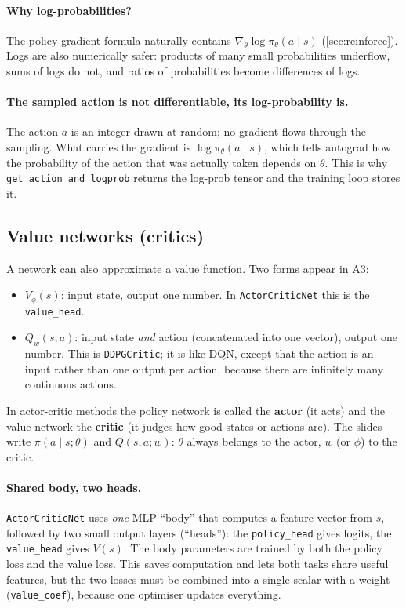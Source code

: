 \documentclass[11pt,a4paper]{article}
\newcommand{\pit}{\pi_\theta}
\newcommand{\gradt}{\nabla_\theta}
\newcommand{\code}[1]{\texttt{#1}}
\begin{document}
\paragraph{Why log-probabilities?} The policy gradient formula naturally contains $\gradt\log\pit(a\mid s)$ (\cref{sec:reinforce}). Logs are also numerically safer: products of many small probabilities underflow, sums of logs do not, and ratios of probabilities become differences of logs.

\paragraph{The sampled action is not differentiable, its log-probability is.} The action $a$ is an integer drawn at random; no gradient flows through the sampling. What carries the gradient is $\log\pit(a\mid s)$, which tells autograd how the probability of the action that was actually taken depends on $\theta$. This is why \code{get\_action\_and\_logprob} returns the log-prob tensor and the training loop stores it.

\subsection{Value networks (critics)}
A network can also approximate a value function. Two forms appear in A3:
\begin{itemize}[nosep]
  \item $V_\phi(s)$: input state, output one number. In \code{ActorCriticNet} this is the \code{value\_head}.
  \item $Q_w(s,a)$: input state \emph{and} action (concatenated into one vector), output one number. This is \code{DDPGCritic}; it is like DQN, except that the action is an input rather than one output per action, because there are infinitely many continuous actions.
\end{itemize}
In actor-critic methods the policy network is called the \textbf{actor} (it acts) and the value network the \textbf{critic} (it judges how good states or actions are). The slides write $\pi(a\mid s;\theta)$ and $Q(s,a;w)$: $\theta$ always belongs to the actor, $w$ (or $\phi$) to the critic.

\paragraph{Shared body, two heads.} \code{ActorCriticNet} uses \emph{one} MLP \enquote{body} that computes a feature vector from $s$, followed by two small output layers (\enquote{heads}): the \code{policy\_head} gives logits, the \code{value\_head} gives $V(s)$. The body parameters are trained by both the policy loss and the value loss. This saves computation and lets both tasks share useful features, but the two losses must be combined into a single scalar with a weight (\code{value\_coef}), because one optimiser updates everything.
\end{document}
